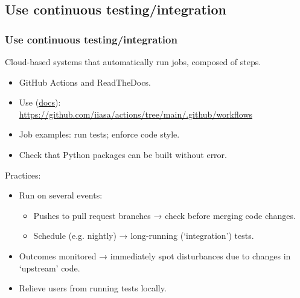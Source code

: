 \documentclass[12pt,aspectratio=169]{beamer}
\begin{document}
\subsection{Use continuous testing/integration}
\begin{frame}
\frametitle{Use continuous testing/integration}

Cloud-based systems that automatically run jobs, composed of steps.
\begin{itemize}
  \item GitHub Actions and ReadTheDocs.
  \item Use  (\href{https://docs.github.com/en/actions/using-workflows/reusing-workflows}{docs}): \\
    \url{https://github.com/iiasa/actions/tree/main/.github/workflows}
  \item Job examples: run tests; enforce code style.
  \item Check that Python packages can be built without error.
\end{itemize}

\medskip
Practices:
\begin{itemize}
  \item Run on several events:
    \begin{itemize}
      \item Pushes to pull request branches → check before merging code changes.
      \item Schedule (e.g. nightly) → long-running (‘integration’) tests.
    \end{itemize}
  \item Outcomes monitored → immediately spot disturbances due to changes in ‘upstream’ code.
  \item Relieve users from running tests locally.
\end{itemize}

\end{frame}
\end{document}
